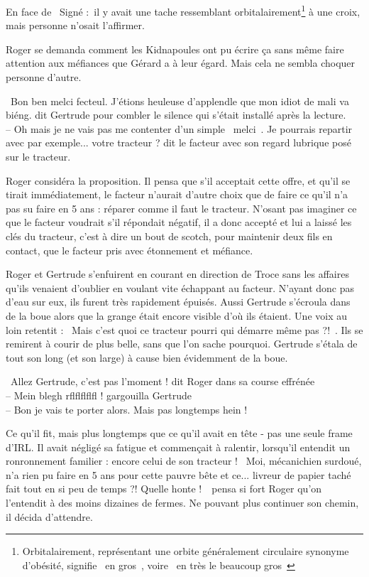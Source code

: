 \documentclass[a5paper, 10pt, twoside]{book}
\newcommand{\cg}{\guillemotleft~}
\newcommand{\cd}{~\guillemotright}
\begin{document}
En face de \cg Signé :\cd il y avait une tache ressemblant orbitalairement\footnote{Orbitalairement, représentant une orbite généralement circulaire synonyme d'obésité, signifie \cg en gros\cd, voire \cg en très le beaucoup gros\cd} à une croix, mais personne n'osait l'affirmer.

Roger se demanda comment les Kidnapoules ont pu écrire ça sans même faire attention aux méfiances que Gérard a à leur égard. Mais cela ne sembla choquer personne d'autre.

\cg Bon ben melci fecteul. J'étions heuleuse d'applendle que mon idiot de mali va biéng. dit Gertrude pour combler le silence qui s'était installé après la lecture.\\
-- Oh mais je ne vais pas me contenter d'un simple \cg melci\cd. Je pourrais repartir avec par exemple... votre tracteur ? dit le facteur avec son regard lubrique posé sur le tracteur.\cd

Roger considéra la proposition. Il pensa que s'il acceptait cette offre, et qu'il se tirait immédiatement, le facteur n'aurait d'autre choix que de faire ce qu'il n'a pas su faire en 5 ans : réparer comme il faut le tracteur. N'osant pas imaginer ce que le facteur voudrait s'il répondait négatif, il a donc accepté et lui a laissé les clés du tracteur, c'est à dire un bout de scotch, pour maintenir deux fils en contact, que le facteur pris avec étonnement et méfiance.

Roger et Gertrude s'enfuirent en courant en direction de Troce sans les affaires qu'ils venaient d'oublier en voulant vite échappant au facteur. N'ayant donc pas d'eau sur eux, ils furent très rapidement épuisés. Aussi Gertrude s'écroula dans de la boue alors que la grange était encore visible d'où ils étaient. Une voix au loin retentit : \cg Mais c'est quoi ce tracteur pourri qui démarre même pas ?!\cd. Ils se remirent à courir de plus belle, sans que l'on %
sache pourquoi. Gertrude s'étala de tout son long (et son large) à cause bien évidemment de la boue.

\cg Allez Gertrude, c'est pas l'moment ! dit Roger dans sa course effrénée\\
-- Mein blegh rflflflflfl ! gargouilla Gertrude\\
-- Bon je vais te porter alors. Mais pas longtemps hein !\cd

Ce qu'il fit, mais plus longtemps que ce qu'il avait en tête - pas une seule frame d'IRL. Il avait négligé sa fatigue et commençait à ralentir, lorsqu'il entendit un ronronnement familier : encore celui de son tracteur ! \cg Moi, mécanichien surdoué, n'a rien pu faire en 5 ans pour cette pauvre bête et ce... livreur de papier taché fait tout en si peu de temps ?! Quelle honte !\cd\ pensa si fort Roger qu'on l'entendit à des moins dizaines de fermes. Ne pouvant plus continuer son chemin, il décida d'attendre.
\end{document}
